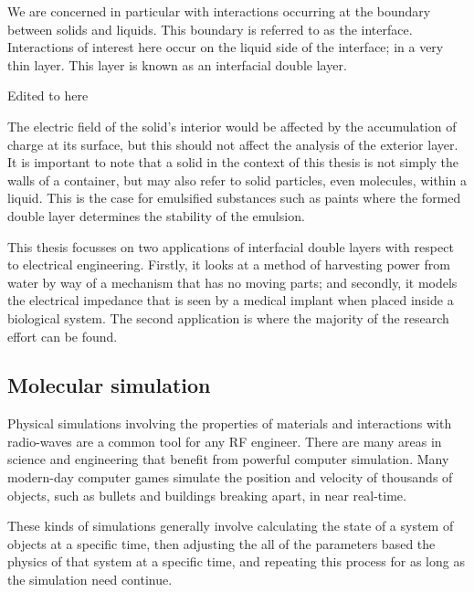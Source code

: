     We are concerned in particular with interactions occurring at the boundary between solids and liquids.
    This boundary is referred to as the interface.
    Interactions of interest here occur on the liquid side of the interface; in a very thin layer.
    This layer is known as an interfacial double layer.

    {\color{blue} Edited to here}
    
    The electric field of the solid's interior would be affected by the accumulation of charge at its surface, but this should not affect the analysis of the exterior layer.
    It is important to note that a solid in the context of this thesis is not simply the walls of a container, but may also refer to solid particles, even molecules, within a liquid.
    This is the case for emulsified substances such as paints where the formed double layer determines the stability of the emulsion.

    This thesis focusses on two applications of interfacial double layers with respect to electrical engineering. Firstly, it looks at a method of harvesting power from water by way of a mechanism that has no moving parts; and secondly, it models the electrical impedance that is seen by a medical implant when placed inside a biological system. The second application is where the majority of the research effort can be found.

  \subsection{Molecular simulation}
    Physical simulations involving the properties of materials and interactions with radio-waves are a common tool for any RF engineer. There are many areas in science and engineering that benefit from powerful computer simulation. Many modern-day computer games simulate the position and velocity of thousands of objects, such as bullets and buildings breaking apart, in near real-time.

    These kinds of simulations generally involve calculating the state of a system of objects at a specific time, then adjusting the all of the parameters based the physics of that system at a specific time, and repeating this process for as long as the simulation need continue.

